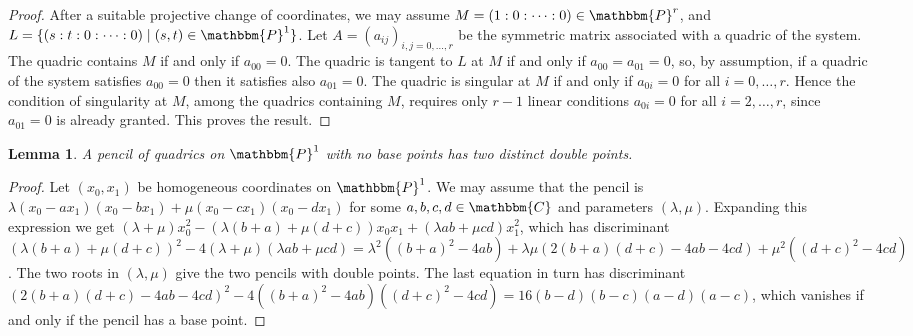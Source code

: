 \documentclass[aps,floatfix,groupedaddress,superscriptaddress,longbibliography,footinbib,notitlepage,showpacs]{revtex4-1}
\newtheorem{lemma}[theorem]{Lemma}
\begin{document}
\begin{proof}
After a suitable projective change of coordinates, we may assume $M = (1:0:\cdots:0) \in \mathbbm{P}^r$,
and $L = \{(s:t:0:\cdots:0) \mid (s,t) \in \mathbbm{P}^1\}$.
Let $A=(a_{ij})_{i, j=0,\ldots, r}$ be the symmetric matrix associated with a quadric of the system. The quadric contains $M$ if and only if $a_{00}=0$. The quadric is tangent to $L$ at $M$ if and only if $a_{00}=a_{01}=0$, so, by assumption, if a quadric of the system satisfies $a_{00}=0$ then it satisfies also $a_{01}=0$. The quadric is singular at $M$ if and only if $a_{0i}=0$ for all $i=0,\ldots, r$. Hence the condition of singularity at $M$, among the quadrics containing $M$, requires only $r-1$ linear conditions
$a_{0i}=0$ for all $i=2,\ldots, r$, since $a_{01}=0$ is already granted. This proves the result. 
\end{proof}



\begin{lemma}\label{lem:pencil}
A pencil of quadrics on $\mathbbm{P}^1$ with no base points has two distinct double points.
\end{lemma}

\begin{proof}
Let $(x_0, x_1)$ be homogeneous coordinates on $\mathbbm{P}^1$.
We may assume that the pencil is $\lambda(x_0-ax_1)(x_0-bx_1)+\mu(x_0-cx_1)(x_0-dx_1)$
for some $a, b, c, d\in\mathbbm{C}$ and parameters $(\lambda, \mu)$. Expanding this expression we get $(\lambda+\mu)x_0^2-\left(\lambda(b+a)+\mu(d+c)\right)x_0x_1+(\lambda ab+\mu cd)x_1^2$, which has discriminant 
$\left(\lambda(b+a)+\mu(d+c)\right)^2-4(\lambda+\mu)(\lambda ab+\mu cd)=\lambda^2((b+a)^2-4ab)+\lambda\mu(2(b+a)(d+c)-4ab-4cd)+\mu^2((d+c)^2-4cd)$. The two roots in $(\lambda,\mu)$ give the two pencils with double points. The last equation in turn has discriminant $(2(b+a)(d+c)-4ab-4cd)^2-4((b+a)^2-4ab)((d+c)^2-4cd)=16(b-d)(b-c)(a-d)(a-c)$, which vanishes if and only if the pencil has a base point.
\end{proof}
\end{document}
